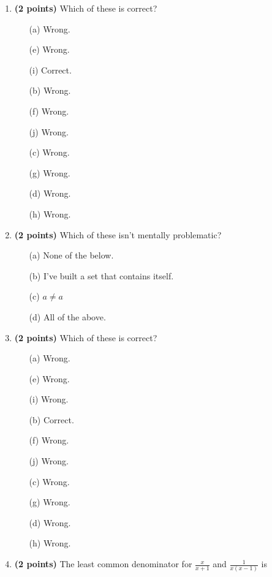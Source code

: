 \documentclass[12pt]{amsart}
\begin{document}
\newpage
\begin{enumerate}
\item {\bf (2 points)} 
 Which of these is correct?

\begin{minipage}[t]{1.0\linewidth}\begin{multicols}{4}\begin{itemize}\item[(a)]  Wrong. \item[(e)]  Wrong. \item[(i)]  Correct. \item[(b)]  Wrong. \item[(f)]  Wrong. \item[(j)]  Wrong. \item[(c)]  Wrong. \item[(g)]  Wrong. \item[] \item[(d)]  Wrong. \item[(h)]  Wrong. \item[] \end{itemize}\end{multicols}\end{minipage} \vfill 
\item {\bf (2 points)} 
 Which of these isn't mentally problematic?

\begin{minipage}[t]{1.0\linewidth}\begin{itemize}\item[(a)]  None of the below.  \item[(b)]  I've built a set that contains itself. \item[(c)]  $a \neq a$ \item[(d)]   All of the above. \end{itemize}\end{minipage} \vfill 
\item {\bf (2 points)} 
 Which of these is correct?

\begin{minipage}[t]{1.0\linewidth}\begin{multicols}{4}\begin{itemize}\item[(a)]  Wrong. \item[(e)]  Wrong. \item[(i)]  Wrong. \item[(b)]  Correct. \item[(f)]  Wrong. \item[(j)]  Wrong. \item[(c)]  Wrong. \item[(g)]  Wrong. \item[] \item[(d)]  Wrong. \item[(h)]  Wrong. \item[] \end{itemize}\end{multicols}\end{minipage} \vfill 
\item {\bf (2 points)} 
 The least common denominator for $\displaystyle \frac{x}{x+1}$ and $\displaystyle \frac{1}{x(x-1)}$ is \vspace{.2cm}


\end{enumerate}
\end{document}
